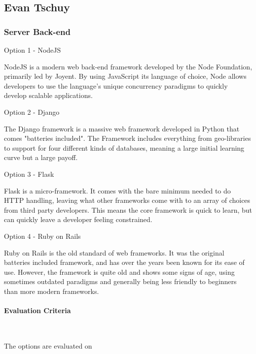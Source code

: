 \documentclass[letterpaper, 10pt, draftclsnofoot, compsoc, onecolumn]{IEEEtran}
\begin{document}
{\medskip








\newpage
\subsection{Evan Tschuy}
\vspace{1pc}
\subsubsection{Server Back-end}
{\noindent Option 1 - NodeJS \par}
{\noindent NodeJS is a modern web back-end framework developed by the Node Foundation,
primarily led by Joyent. By using JavaScript its language of choice, Node allows
developers to use the language's unique concurrency paradigms to quickly develop
scalable applications. \par}
{\noindent Option 2 - Django \par}
{\noindent The Django framework is a massive web framework developed in Python that comes "batteries
included". The Framework includes everything from geo-libraries to support for four different kinds of
databases, meaning a large initial learning curve but a large payoff. \par}
{\noindent Option 3 - Flask \par}
{\noindent Flask is a micro-framework. It comes with the bare minimum needed to do HTTP handling, leaving
what other frameworks come with to an array of choices from third party developers. This means the core
framework is quick to learn, but can quickly leave a developer feeling constrained. \par}
{\noindent Option 4 - Ruby on Rails \par}
{\noindent Ruby on Rails is the old standard of web frameworks. It was the original batteries included
framework, and has over the years been known for its ease of use. However, the framework is quite old
and shows some signs of age, using sometimes outdated paradigms and generally being less friendly to beginners
than more modern frameworks. \par}

\medskip
\newpage
\paragraph{Evaluation Criteria} ~\\
{\noindent The options are evaluated on

}}
\end{document}
